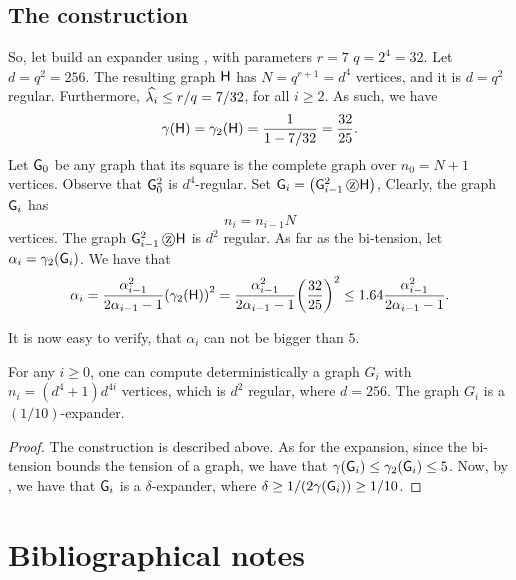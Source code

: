 \subsection{The construction}

So, let build an expander using , with parameters
$r=7$ $q=2^4=32$. Let $d= q^2 = 256$.  The resulting graph $\mathsf{H}$
has $N=q^{r+1} = d^4$ vertices, and it is $d=q^2$
regular. Furthermore, $\widehat{\lambda_{i}}\leq r/q= 7/32$, for all $i\geq 2$. As
such, we have
\[
\DialX{\GraphB}=
\BiDialX{\GraphB} = \frac{1}{1-7/32} = \frac{32}{25}.
\]
Let $\mathsf{G}_0$ be any graph that its square is the complete graph over
$n_0 = N+1$ vertices. Observe that $\mathsf{G}_0^2$ is $d^4$-regular. Set
$\Graph_i = \pth{\ZProd{\Graph_{i-1}^2}{\GraphB}}$, Clearly, the graph
$\mathsf{G}_i$ has
\[
n_i = n_{i-1} N
\]
vertices. The graph $\mathsf{G}_{i-1}^2 \, \text{\textcircled{z}} \mathsf{H}$ is $d^2$
regular. As far as the bi-tension, let $\alpha_i =
\BiDialX{\Graph_i}$. We have that
\[
\alpha_i = 
\frac{\alpha_{i-1}^2}{2\alpha_{i-1} -1 }
\pth{\BiDialX{\GraphB}}^2
=
\frac{\alpha_{i-1}^2}{2\alpha_{i-1} -1 }
\pth{\frac{32}{25}}^2 \leq 
1.64 \frac{\alpha_{i-1}^2}{2\alpha_{i-1} -1 }.
\]

It is now easy to verify, that $\alpha_i$ can not be bigger than
$5$.

\begin{theorem}
    For any $i \geq 0$, one can compute deterministically a graph
    $G_i$ with $n_i = (d^4+1)d^{4i}$ vertices, which is $d^2$ regular,
    where $d=256$. The graph $G_i$ is a $(1/10)$-expander.
\end{theorem}

\begin{proof}
    The construction is described above. As for the expansion, since
    the bi-tension bounds the tension of a graph, we have that
    $\DialX{\Graph_i} \leq \BiDialX{\Graph_i} \leq 5$. Now, by
    , we have that $\mathsf{G}_i$ is a
    $\delta$-expander, where $\delta \geq 1/(2\DialX{\Graph_i}) \geq
    1/10$.
\end{proof}





\section{Bibliographical notes}



